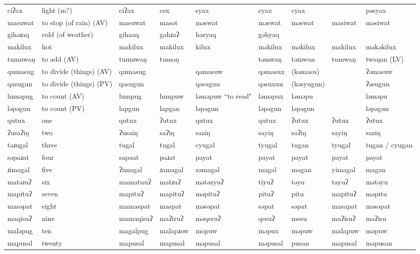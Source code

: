 \begin{landscape}
\begin{longtable}{*{9}{>{\raggedright\arraybackslash}p{}}}
\text{*}ciʔax & light (m?) & ciʔax & cex & syax & cyax & cyax &  & pəsyax\\
\text{*}masuwat & to stop (of rain) (AV) & masuwat & masot & məswat & məswat & məswat & masiwat & məsiwat\\
\text{*}gihəɹaq & cold (of weather) & gihaaq & gahɹaʔ & həzyaq & gəhyaq &  &  & \\
\text{*}makilux & hot & makilux & makilux & kilux & məkilux & məkilux & makilux & məkəkilux\\
\text{*}tumuwaŋ & to add (AV) & tumuwaŋ & tumoŋ &  & təmwaŋ & təmwan & tumwaŋ & twaŋan (LV)\\
\text{*}qumasug & to divide (things) (AV) & qumasug &  & qəmasuw & qəmasux & (kəmasu) &  & ʔəmasuw\\
\text{*}qasugun & to divide (things) (PV) & qasugun &  & qəsugun & qəsuxun & (kəsyugun) &  & ʔəsugun\\
\text{*}luməpug & to count (AV) & lumpug & lumpuw & ləməpuw ``to read" & ləməpux & ləməpu &  & ləməpu\\
\text{*}ləpəgun & to count (PV) & lapgun & lapgan & ləpəgun & ləpəgun & ləpəgun &  & ləpəgun\\
\text{*}qutux & one & qutux & ʔutux & qutux & qutux & ʔutux & ʔutux & ʔutux\\
\text{*}ʔusaʔiŋ & two & ʔusaiŋ & saʔiŋ & saziŋ & sayiŋ & saʔiŋ & sayiŋ & saziŋ\\
\text{*}təɹugal & three & tugal & tugal & cyugal & tyugal & tugan & tyugal & tugan / cyugan\\
\text{*}səpaɹat & four & sapaat & paɹat & payat & payat & payat & payat & payat\\
\text{*}ɹimagal & five & ʔimagal & ɹamagal & zəmagal & magal & magan & yimagal & magan\\
\text{*}matəɹuʔ & six & mamatuuʔ & matɹuʔ & mətəzyuʔ & tiyuʔ & təyu & tayuʔ & mətəyu\\
\text{*}mapituʔ & seven & mapituʔ & mapituʔ & məpituʔ & pituʔ & pitu & mapituʔ & məpitu\\
\text{*}masəpat & eight & mamaspat & maspat & məsəpat & səpat & səpat & masapat & məsəpat\\
\text{*}maqisuʔ & nine & mamaqisuʔ & maʔiruʔ & məqeruʔ & qesuʔ & mesu & maʔisuʔ & məʔisu\\
\text{*}maləpug & ten & magalpug & malapɹow & mopuw & məpux & məpuw & malapuw & məpuw\\
\text{*}mapusal & twenty & mapusal & mapusal & məpusal & məpusal & pusan & mapusal & məpusan\\

\end{longtable}
\end{landscape}
